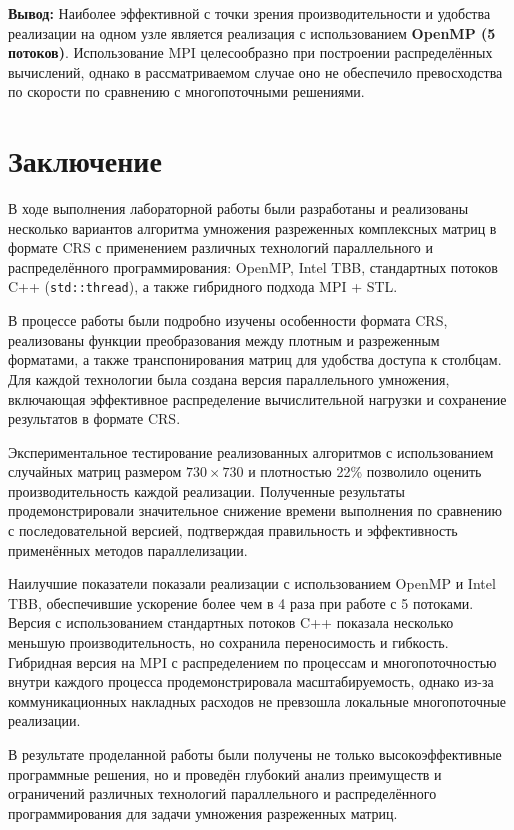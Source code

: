 \documentclass[a4paper,12pt]{article}
\begin{document}
\vspace{1em}
\textbf{Вывод:}
Наиболее эффективной с точки зрения производительности и удобства реализации на одном узле является реализация с использованием \textbf{OpenMP (5 потоков)}. Использование MPI целесообразно при построении распределённых вычислений, однако в рассматриваемом случае оно не обеспечило превосходства по скорости по сравнению с многопоточными решениями.

\newpage

\section{Заключение}

В ходе выполнения лабораторной работы были разработаны и реализованы несколько вариантов алгоритма умножения разреженных комплексных матриц в формате CRS с применением различных технологий параллельного и распределённого программирования: OpenMP, Intel TBB, стандартных потоков C++ (\texttt{std::thread}), а также гибридного подхода MPI + STL.

В процессе работы были подробно изучены особенности формата CRS, реализованы функции преобразования между плотным и разреженным форматами, а также транспонирования матриц для удобства доступа к столбцам. Для каждой технологии была создана версия параллельного умножения, включающая эффективное распределение вычислительной нагрузки и сохранение результатов в формате CRS.

Экспериментальное тестирование реализованных алгоритмов с использованием случайных матриц размером $730 \times 730$ и плотностью 22\% позволило оценить производительность каждой реализации. Полученные результаты продемонстрировали значительное снижение времени выполнения по сравнению с последовательной версией, подтверждая правильность и эффективность применённых методов параллелизации.

Наилучшие показатели показали реализации с использованием OpenMP и Intel TBB, обеспечившие ускорение более чем в 4 раза при работе с 5 потоками. Версия с использованием стандартных потоков C++ показала несколько меньшую производительность, но сохранила переносимость и гибкость. Гибридная версия на MPI с распределением по процессам и многопоточностью внутри каждого процесса продемонстрировала масштабируемость, однако из-за коммуникационных накладных расходов не превзошла локальные многопоточные реализации.

В результате проделанной работы были получены не только высокоэффективные программные решения, но и проведён глубокий анализ преимуществ и ограничений различных технологий параллельного и распределённого программирования для задачи умножения разреженных матриц.
\end{document}
